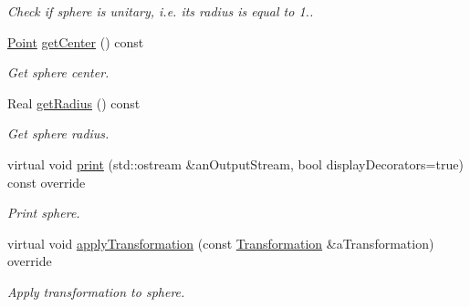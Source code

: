 \begin{DoxyCompactItemize}
\begin{DoxyCompactList}\small\item\em Check if sphere is unitary, i.\+e. its radius is equal to 1.. \end{DoxyCompactList}\item 
\hyperlink{classlibrary_1_1math_1_1geom_1_1d3_1_1objects_1_1_point}{Point} \hyperlink{classlibrary_1_1math_1_1geom_1_1d3_1_1objects_1_1_sphere_a871367ab75aa46194a6b8ddc8a45967f}{get\+Center} () const
\begin{DoxyCompactList}\small\item\em Get sphere center. \end{DoxyCompactList}\item 
Real \hyperlink{classlibrary_1_1math_1_1geom_1_1d3_1_1objects_1_1_sphere_a48cfc72b6eec9a953fb837a13e1df45e}{get\+Radius} () const
\begin{DoxyCompactList}\small\item\em Get sphere radius. \end{DoxyCompactList}\item 
virtual void \hyperlink{classlibrary_1_1math_1_1geom_1_1d3_1_1objects_1_1_sphere_adc05fd7666ae15513e6aa9ec66a1ca9b}{print} (std\+::ostream \&an\+Output\+Stream, bool display\+Decorators=true) const override
\begin{DoxyCompactList}\small\item\em Print sphere. \end{DoxyCompactList}\item 
virtual void \hyperlink{classlibrary_1_1math_1_1geom_1_1d3_1_1objects_1_1_sphere_acb4ca3f037791f9f71bffc904a1bf961}{apply\+Transformation} (const \hyperlink{classlibrary_1_1math_1_1geom_1_1d3_1_1_transformation}{Transformation} \&a\+Transformation) override
\begin{DoxyCompactList}\small\item\em Apply transformation to sphere. \end{DoxyCompactList}\end{DoxyCompactItemize}
